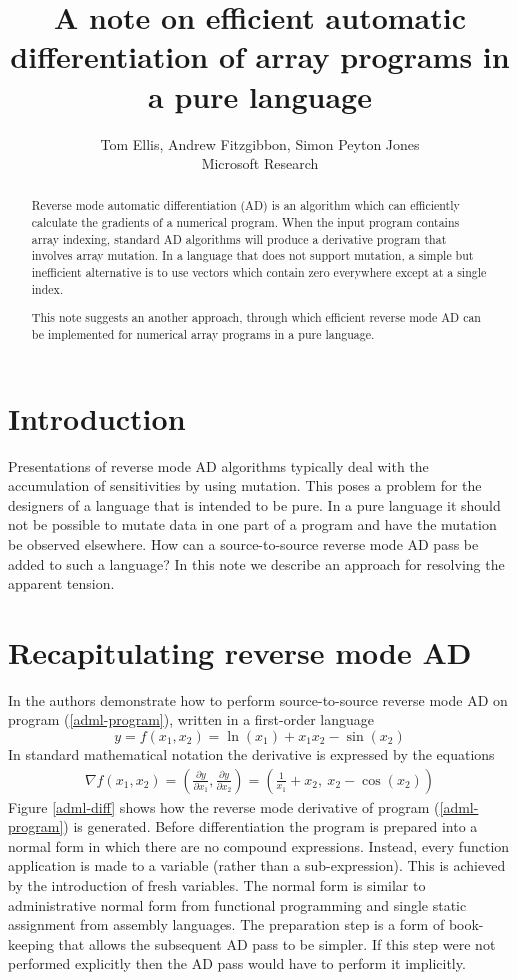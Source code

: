 \documentclass[12pt]{article}
\title{A note on efficient automatic differentiation of array programs
  in a pure language}
\author{Tom Ellis, Andrew Fitzgibbon, Simon Peyton Jones\\Microsoft Research}
\begin{document}
\maketitle

\begin{abstract}
Reverse mode automatic differentiation (AD) is an algorithm which can
efficiently calculate the gradients of a numerical program.  When the
input program contains array indexing, standard AD algorithms will
produce a derivative program that involves array mutation.  In a
language that does not support mutation, a simple but inefficient
alternative is to use vectors which contain zero everywhere except at
a single index.

This note suggests an another approach, through which efficient reverse mode AD
can be implemented for numerical array programs in a pure
language.
\end{abstract}

\section{Introduction}

Presentations of reverse mode AD algorithms typically deal with the
accumulation of sensitivities by using mutation.  This poses a problem
for the designers of a language that is intended to be pure.  In a
pure language it should not be possible to mutate data in one part of
a program and have the mutation be observed elsewhere.  How can a
source-to-source reverse mode AD pass be added to such a language?  In
this note we describe an approach for resolving the apparent tension.

\section{Recapitulating reverse mode AD}

In \cite{adml} the authors demonstrate how to perform source-to-source
reverse mode AD on program (\ref{adml-program}), written in a
first-order language
\begin{equation}
\label {adml-program}
y = f(x_1, x_2) = \ln(x_1)+x_1 x_2-\sin(x_2)
\end{equation}
In standard mathematical notation the derivative is expressed by the
equations
\begin{align*}
  \nabla{f}(x_1, x_2)
  = \left(\frac{\partial y}{\partial x_1},
  \frac{\partial y}{\partial x_2} \right)
  = \left(\frac{1}{x_1} + x_2, ~x_2 - \cos(x_2)\right)
\end{align*}
Figure \ref{adml-diff} shows how the reverse mode derivative of
program (\ref{adml-program}) is generated.  Before differentiation the
program is prepared into a normal form in which there are no compound
expressions. Instead, every function application is made to a variable
(rather than a sub-expression).  This is achieved by the introduction
of fresh variables.  The normal form is similar to administrative
normal form from functional programming and single static assignment
from assembly languages.  The preparation step is a form of
book-keeping that allows the subsequent AD pass to be simpler.  If
this step were not performed explicitly then the AD pass would have to
perform it implicitly.
\end{document}
